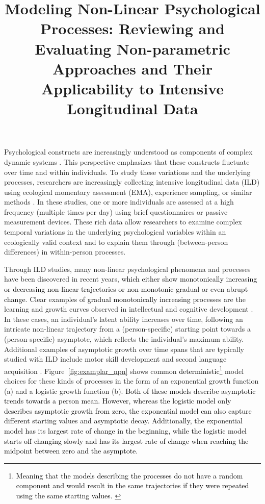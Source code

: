 \documentclass[man, floatsintext]{apa7}
\title{Modeling Non-Linear Psychological Processes: Reviewing and Evaluating
  Non-parametric Approaches and Their Applicability to Intensive
  Longitudinal Data}
\begin{document}
\maketitle

Psychological constructs are increasingly understood as components of complex
dynamic systems \parencite{nesselroade_studying_2004, wang_investigating_2012}.
This perspective emphasizes that these constructs fluctuate over time and
within individuals. To study these variations and the underlying processes,
researchers are increasingly collecting intensive longitudinal data (ILD) using
ecological momentary assessment (EMA), experience sampling, or similar methods
\parencite{fritz_so_2023}. In these studies, one or more individuals are
assessed at a high frequency (multiple times per day) using brief
questionnaires or passive measurement devices. These rich data allow
researchers to examine complex temporal variations in the underlying
psychological variables within an ecologically valid context and to explain
them through (between-person differences) in within-person processes.

Through ILD studies, many non-linear psychological phenomena and processes have
been discovered in recent years, \textcolor{black}{which either show
  monotonically increasing or decreasing non-linear trajectories or
  non-monotonic
  gradual or even abrupt change}. Clear examples of \textcolor{black}{ gradual
  monotonically increasing processes} are the learning and growth curves
observed
in intellectual and cognitive development \parencite{kunnen_dynamic_2012,
  mcardle_comparative_2002}. In these cases, an individual's latent ability
increases over time, following an intricate non-linear trajectory from a
(person-specific) starting point towards a (person-specific) asymptote, which
reflects the individual's maximum ability. Additional examples of asymptotic
growth over time spans that are typically studied with ILD include
motor skill development \parencite{newell_time_2001} and second language
acquisition \parencite{de_bot_dynamic_2007}. Figure~\ref{fig:examplar_npn}
shows common \textcolor{black}{deterministic}\footnote{\textcolor{black}{
    Meaning that the models describing the processes do not have a random
    component and would result in the same trajectories if they were repeated
    using the same starting values.
  }} model choices for these kinds of
processes in the form of an exponential growth function (a) and a logistic
growth function (b). \textcolor{black}{Both of these models describe asymptotic
  trends towards a person mean. However, whereas the logistic model only
  describes asymptotic growth from zero, the exponential model can also capture
  different starting values and asymptotic decay. Additionally, the exponential
  model has its largest rate of change in the beginning, while the logistic
  model
  starts off changing slowly and has its largest rate of change when reaching
  the
  midpoint between zero and the asymptote.}
\end{document}
